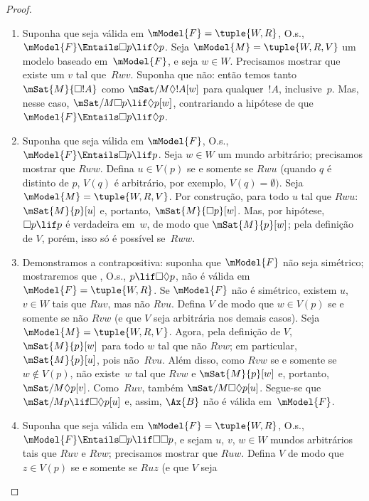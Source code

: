 \documentclass[../../../include/open-logic-section]{subfiles}
\begin{document}
\begin{proof}
  \begin{enumerate}
  \item Suponha que  seja válida em
    $\mModel{F} = \tuple{W, R}$, O.s.\@,
    $\mModel{F} \Entails \Box p \lif \Diamond p$. Seja
    $\mModel{M} = \tuple{W, R, V}$ um modelo baseado em~$\mModel{F}$, e seja
    $w \in W$. Precisamos mostrar que existe um $v$ tal que~$Rwv$. Suponha
    que não: então temos tanto $\mSat{M}{\Box !A}$ como
    $\mSat/{M}{\Diamond !A}[w]$ para qualquer~$!A$, inclusive~$p$. Mas, nesse caso,
    $\mSat/{M}{\Box p \lif \Diamond p}[w]$, contrariando a hipótese de que
    $\mModel{F} \Entails \Box p \lif \Diamond p$.
  \item Suponha que  seja válida em $\mModel{F}$, O.s.\@,
    $\mModel{F} \Entails \Box p \lif p$. Seja $w \in W$ um mundo arbitrário;
    precisamos mostrar que $Rww$. Defina $u \in V(p)$ se e somente se $Rwu$
    (quando $q$ é distinto de $p$, $V(q)$ é arbitrário, por exemplo,
    $V(q) = \emptyset)$. Seja $\mModel{M} = \tuple{W, R, V}$. Por construção,
    para todo $u$ tal que $Rwu$: $\mSat{M}{p}[u]$ e, portanto,
    $\mSat{M}{\Box p}[w]$. Mas, por hipótese, $\Box p \lif p$ é verdadeira
    em~$w$, de modo que $\mSat{M}{p}[w]$; pela definição de $V$, porém, isso
    só é possível se~$Rww$.
  \item Demonstramos a contrapositiva: suponha que $\mModel{F}$ não seja
    simétrico; mostraremos que , O.s.\@, $p \lif \Box\Diamond p$, não é
    válida em $\mModel{F}= \tuple{W, R}$. Se $\mModel{F}$ não é simétrico,
    existem $u$, $v \in W$ tais que $Ruv$, mas não $Rvu$. Defina $V$ de modo
    que $w \in V(p)$ se e somente se não $Rvw$ (e que $V$ seja arbitrária nos
    demais casos). Seja $\mModel{M} =\tuple{W, R, V}$. Agora, pela definição de
    $V$, $\mSat{M}{p}[w]$ para todo $w$ tal que não $Rvw$; em particular,
    $\mSat{M}{p}[u]$, pois não~$Rvu$. Além disso, como $Rvw$ se e somente se
    $w \notin V(p)$, não existe~$w$ tal que $Rvw$ e $\mSat{M}{p}[w]$ e,
    portanto, $\mSat/{M}{\Diamond p}[v]$. Como~$Ruv$, também
    $\mSat/{M}{\Box\Diamond p}[u]$. Segue-se que
    $\mSat/{M}{p \lif \Box\Diamond p}[u]$ e, assim, $\Ax{B}$ não é válida
    em~$\mModel{F}$.
  \item Suponha que  seja válida em $\mModel{F} = \tuple{W,R}$, O.s.\@,
    $\mModel{F} \Entails \Box p \lif \Box\Box p$, e sejam $u$, $v$, $w \in W$
    mundos arbitrários tais que $Ruv$ e $Rvw$; precisamos mostrar que $Ruw$.
    Defina $V$ de modo que $z \in V(p)$ se e somente se $Ruz$ (e que $V$ seja

\end{enumerate}
\end{proof}
\end{document}
